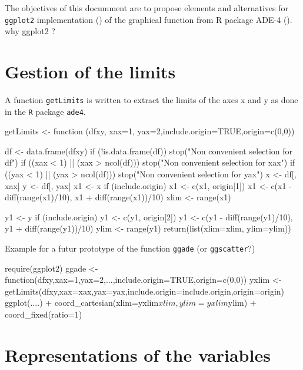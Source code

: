 \documentclass[a4paper,10pt]{article}
\begin{document}
The objectives of this documment are to propose elements and alternatives for \texttt{ggplot2} implementation (\cite{ggplot2}) of the graphical function from R package ADE-4 (\cite{ade4_2004,ade4_2007a,ade4_2007b}). why ggplot2 ?


\section{Gestion of the limits}

A function \texttt{getLimits} is written to extract the limits of the axes x and y as done in the \texttt{R} package \texttt{ade4}.

\begin{Schunk}
\begin{Sinput}
  getLimits <- function (dfxy, xax=1, yax=2,include.origin=TRUE,origin=c(0,0)){
 	df <- data.frame(dfxy)
 	if (!is.data.frame(df)) 
 		stop("Non convenient selection for df")
 	if ((xax < 1) || (xax > ncol(df))) 
 		stop("Non convenient selection for xax")
 	if ((yax < 1) || (yax > ncol(df))) 
 		stop("Non convenient selection for yax")
 	x <- df[, xax]
 	y <- df[, yax]
 	x1 <- x
 	if (include.origin) 
 		x1 <- c(x1, origin[1])
 	x1 <- c(x1 - diff(range(x1)/10), x1 + diff(range(x1))/10)
 	xlim <- range(x1)
 	
 	y1 <- y
 	if (include.origin) 
 		y1 <- c(y1, origin[2])
 	y1 <- c(y1 - diff(range(y1)/10), y1 + diff(range(y1))/10)
 	ylim <- range(y1)
 	return(list(xlim=xlim, ylim=ylim))
 }
\end{Sinput}
\end{Schunk}

Example for a futur prototype of the function \texttt{ggade} (or \texttt{ggscatter}?)

\begin{Schunk}
\begin{Sinput}
  require(ggplot2)
  ggade <- function(dfxy,xax=1,yax=2,...,include.origin=TRUE,origin=c(0,0)){
   yxlim <- getLimits(dfxy,xax=xax,yax=yax,include.origin=include.origin,origin=origin)
   ggplot(....) + coord_cartesian(xlim=yxlim$xlim,ylim=yxlim$ylim) + coord_fixed(ratio=1)
 }
\end{Sinput}
\end{Schunk}


\section{Representations of the variables}
\end{document}

